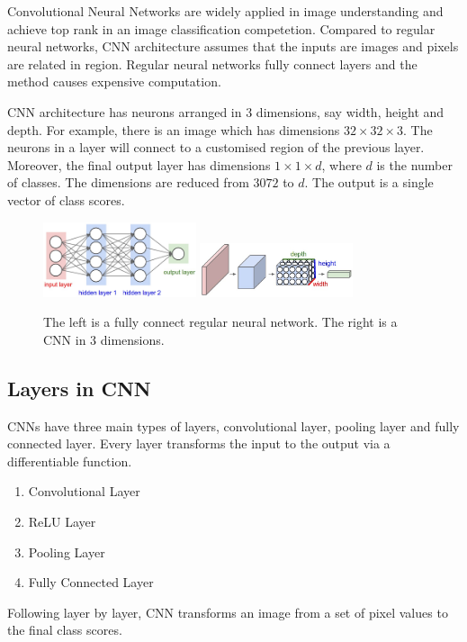Convolutional Neural Networks\citep{lecun1998gradient} are widely applied in image understanding and achieve top rank in an image classification competetion\citep{krizhevsky2012imagenet}. Compared to regular neural networks, CNN architecture assumes that the inputs are images and pixels are related in region. Regular neural networks fully connect layers and the method causes expensive computation.

CNN architecture has neurons arranged in 3 dimensions, say width, height and depth. For example, there is an image which has dimensions $32\times 32\times 3$. The neurons in a layer will connect to a customised region of the previous layer. Moreover, the final output layer has dimensions $1\times 1\times d$, where $d$ is the number of classes. The dimensions are reduced from $3072$ to $d$. The output is a single vector of class scores.

\graphicspath{ {./Figures/} }
\begin{figure}[!htb]
\centering
\includegraphics[width=0.4\textwidth]{neural_net2.jpeg}
\includegraphics[width=0.4\textwidth]{cnn.jpeg}
\caption{\label{fig:compareCNNandFC}The left is a fully connect regular neural network. The right is a CNN in 3 dimensions.}
\end{figure}

\subsection{Layers in CNN}
CNNs have three main types of layers, convolutional layer, pooling layer and fully connected layer. Every layer transforms the input to the output via a differentiable function. 
\begin{enumerate}
  \item Convolutional Layer
  \item ReLU Layer
  \item Pooling Layer
  \item Fully Connected Layer
\end{enumerate}
Following layer by layer, CNN transforms an image from a set of pixel values to the final class scores.

